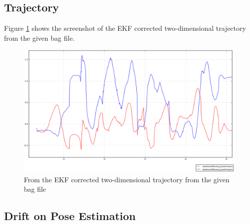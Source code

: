 \documentclass[14pt,a4paper]{article}
\begin{document}
	\subsection{Trajectory}
		Figure \ref{graph:filtered_pose_corrected} shows the screenshot of the EKF corrected two-dimensional trajectory from the given bag file.
	
	\begin{figure}[htbp]
	\centering
	\includegraphics[scale=0.4]{filtered_pose_corrected.png}
  	\caption{From the EKF corrected two-dimensional trajectory from the given bag file}
    \label{graph:filtered_pose_corrected}
	\end{figure}
		
	
	\subsection{Drift on Pose Estimation}
	
	
\end{document}
